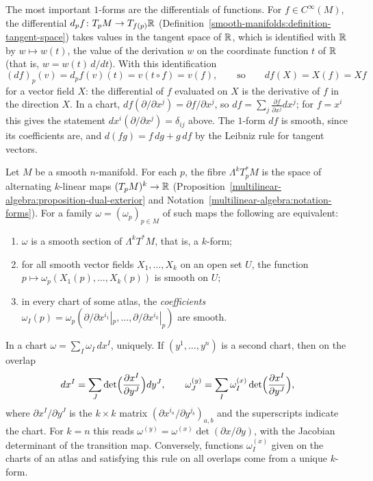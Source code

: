 \begin{remark}\label{differential-forms:remark-differential-function}
The most important $1$-forms are the differentials of functions. For $f \in C^\infty(M)$, the differential $d_pf \colon T_pM \to T_{f(p)}\mathbb{R}$ (Definition~\ref{smooth-manifolds:definition-tangent-space})
takes values in the tangent space of $\mathbb{R}$, which is identified with $\mathbb{R}$ by $w \mapsto w(t)$, the value of the derivation $w$ on the coordinate function $t$ of $\mathbb{R}$ (that is, $w = w(t)\,d/dt$).
With this identification
\[
(df)_p(v) = d_pf(v)(t) = v(t \circ f) = v(f), \qquad\text{so}\qquad df(X) = X(f) = Xf
\]
for a vector field $X$: the differential of $f$ evaluated on $X$ is the derivative of $f$ in the direction $X$. In a chart, $df(\partial/\partial x^j) = \partial f/\partial x^j$, so
$df = \sum_j\frac{\partial f}{\partial x^j}dx^j$; for $f = x^i$ this gives the statement $dx^i(\partial/\partial x^j) = \delta_{ij}$ above. The $1$-form $df$ is smooth, since its coefficients are, and
$d(fg) = f\,dg + g\,df$ by the Leibniz rule for tangent vectors.
\end{remark}

\begin{proposition}\label{differential-forms:proposition-forms-descriptions}
Let $M$ be a smooth $n$-manifold. For each $p$, the fibre $\Lambda^kT_p^*M$ is the space of alternating $k$-linear maps $(T_pM)^k \to \mathbb{R}$
(Proposition~\ref{multilinear-algebra:proposition-dual-exterior} and Notation~\ref{multilinear-algebra:notation-forms}). For a family $\omega = (\omega_p)_{p \in M}$ of such maps the
following are equivalent:
\begin{enumerate}
\item $\omega$ is a smooth section of $\Lambda^kT^*M$, that is, a $k$-form;
\item for all smooth vector fields $X_1, \ldots, X_k$ on an open set $U$, the function $p \mapsto \omega_p(X_1(p), \ldots, X_k(p))$ is smooth on $U$;
\item in every chart of some atlas, the \emph{coefficients} $\omega_I(p) = \omega_p(\partial/\partial x^{i_1}|_p, \ldots, \partial/\partial x^{i_k}|_p)$ are smooth.
\end{enumerate}
In a chart $\omega = \sum_I\omega_I\,dx^I$, uniquely. If $(y^1, \ldots, y^n)$ is a second chart, then on the overlap
\[
dx^I = \sum_J\det\Bigl(\frac{\partial x^I}{\partial y^J}\Bigr)dy^J, \qquad \omega^{(y)}_J = \sum_I\omega^{(x)}_I\det\Bigl(\frac{\partial x^I}{\partial y^J}\Bigr),
\]
where $\partial x^I/\partial y^J$ is the $k \times k$ matrix $(\partial x^{i_a}/\partial y^{j_b})_{a,b}$ and the superscripts indicate the chart. For $k = n$ this reads
$\omega^{(y)} = \omega^{(x)}\det(\partial x/\partial y)$, with the Jacobian determinant of the transition map. Conversely, functions $\omega^{(x)}_I$ given on the charts of an atlas
and satisfying this rule on all overlaps come from a unique $k$-form.
\end{proposition}

